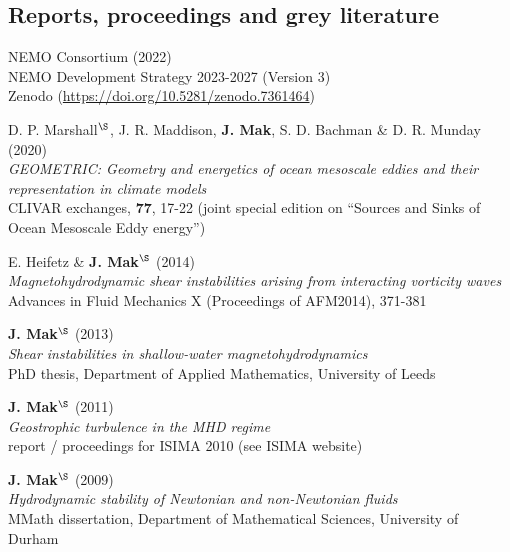 \documentclass[letterpaper]{article}
\renewenvironment{itemize}{
  \begin{list}{}{
    \setlength{\leftmargin}{1.5em}
  }
}{
  \end{list}
}
\begin{document}
\subsection*{Reports, proceedings and grey literature}
\begin{itemize}

\item[F.] NEMO Consortium (2022)\\
NEMO Development Strategy 2023-2027 (Version 3)\\
Zenodo (\url{https://doi.org/10.5281/zenodo.7361464})

\item[E.] D. P. Marshall$^{\S}$, J. R. Maddison, \textbf{J. Mak}, S. D. Bachman \& D. R. Munday (2020)\\
\textit{GEOMETRIC: Geometry and energetics of ocean mesoscale eddies and their representation in climate models}\\
CLIVAR exchanges, \textbf{77}, 17-22 (joint special edition on ``Sources and Sinks
of Ocean Mesoscale Eddy energy'')

\item[D.] E. Heifetz \& \textbf{J. Mak}$^{\S}$ (2014)\\
\textit{Magnetohydrodynamic shear instabilities arising from interacting
vorticity waves}\\
Advances in Fluid Mechanics X (Proceedings of AFM2014), 371-381

\item[C.] \textbf{J. Mak}$^{\S}$ (2013)\\
\textit{Shear instabilities in shallow-water magnetohydrodynamics}\\
PhD thesis, Department of Applied Mathematics, University of Leeds

\item[B.] \textbf{J. Mak}$^{\S}$ (2011)\\
\textit{Geostrophic turbulence in the MHD regime}\\
report / proceedings for ISIMA 2010 (see ISIMA website)

\item[A.] \textbf{J. Mak}$^{\S}$ (2009)\\
\textit{Hydrodynamic stability of Newtonian and non-Newtonian fluids}\\
MMath dissertation, Department of Mathematical Sciences, University of Durham
\end{itemize}

\end{document}
